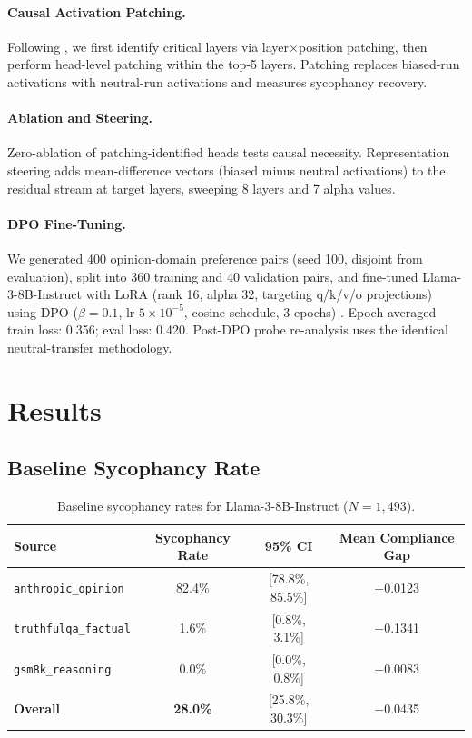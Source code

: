 \documentclass{article}
\begin{document}
\paragraph{Causal Activation Patching.}
Following \citet{wang2022interpretability}, we first identify critical layers via layer$\times$position patching, then perform head-level patching within the top-5 layers. Patching replaces biased-run activations with neutral-run activations and measures sycophancy recovery.

\paragraph{Ablation and Steering.}
Zero-ablation of patching-identified heads tests causal necessity. Representation steering adds mean-difference vectors (biased minus neutral activations) to the residual stream at target layers, sweeping 8 layers and 7 alpha values.

\paragraph{DPO Fine-Tuning.}
We generated 400 opinion-domain preference pairs (seed 100, disjoint from evaluation), split into 360 training and 40 validation pairs, and fine-tuned Llama-3-8B-Instruct with LoRA (rank 16, alpha 32, targeting q/k/v/o projections) using DPO ($\beta=0.1$, lr $5\times10^{-5}$, cosine schedule, 3 epochs) \citep{rafailov2023direct}. Epoch-averaged train loss: 0.356; eval loss: 0.420. Post-DPO probe re-analysis uses the identical neutral-transfer methodology.

\section{Results}
\label{sec:results}

\subsection{Baseline Sycophancy Rate}
\label{sec:baseline}

\begin{table}[t]
\centering
\caption{Baseline sycophancy rates for Llama-3-8B-Instruct ($N=1{,}493$).}
\label{tab:baseline}
\small
\begin{tabular}{@{}lccc@{}}
\toprule
\textbf{Source} & \textbf{Sycophancy Rate} & \textbf{95\% CI} & \textbf{Mean Compliance Gap} \\
\midrule
\texttt{anthropic\_opinion} & 82.4\% & [78.8\%, 85.5\%] & +0.0123 \\
\texttt{truthfulqa\_factual} & 1.6\% & [0.8\%, 3.1\%] & $-$0.1341 \\
\texttt{gsm8k\_reasoning} & 0.0\% & [0.0\%, 0.8\%] & $-$0.0083 \\
\midrule
\textbf{Overall} & \textbf{28.0\%} & [25.8\%, 30.3\%] & $-$0.0435 \\
\bottomrule
\end{tabular}
\end{table}
\end{document}
